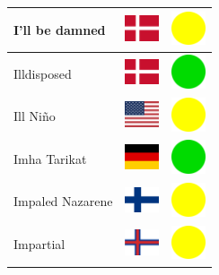 \documentclass[12pt, a4paper, twoside]{report}
\begin{document}
\begin{center}
\begin{longtable}{|p{5cm}|p{2cm}|p{2cm}|}
 I'll be damned                                             & \includegraphics[width=1cm]{4x3/dk} &   \includegraphics[width=1cm]{likes/m} \\ \hline
 Illdisposed                                                & \includegraphics[width=1cm]{4x3/dk} &   \includegraphics[width=1cm]{likes/y} \\ \hline
 Ill Niño                                                   & \includegraphics[width=1cm]{4x3/us} &   \includegraphics[width=1cm]{likes/m} \\ \hline
 Imha Tarikat                                               & \includegraphics[width=1cm]{4x3/de} &   \includegraphics[width=1cm]{likes/y} \\ \hline
 Impaled Nazarene                                           & \includegraphics[width=1cm]{4x3/fi} &   \includegraphics[width=1cm]{likes/m} \\ \hline
 Impartial                                                  & \includegraphics[width=1cm]{4x3/fo} &   \includegraphics[width=1cm]{likes/m} \\ \hline

\end{longtable}
\end{center}
\end{document}
